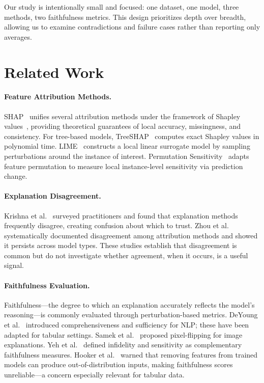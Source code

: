 \documentclass[conference, 10pt]{IEEEtran}
\begin{document}
Our study is intentionally small and focused: one dataset, one model, three methods, two faithfulness metrics. This design prioritizes depth over breadth, allowing us to examine contradictions and failure cases rather than reporting only averages.

\section{Related Work}
\label{sec:related-work}

\paragraph{Feature Attribution Methods.}
SHAP~\cite{lundberg2017shap} unifies several attribution methods under the framework of Shapley values~\cite{shapley1953value}, providing theoretical guarantees of local accuracy, missingness, and consistency. For tree-based models, TreeSHAP~\cite{lundberg2020treeshap} computes exact Shapley values in polynomial time. LIME~\cite{ribeiro2016lime} constructs a local linear surrogate model by sampling perturbations around the instance of interest. Permutation Sensitivity~\cite{fisher2019permutation, breiman2001random} adapts feature permutation to measure local instance-level sensitivity via prediction change.

\paragraph{Explanation Disagreement.}
Krishna et al.~\cite{krishna2022disagreement} surveyed practitioners and found that explanation methods frequently disagree, creating confusion about which to trust. Zhou et al.~\cite{zhou2022feature} systematically documented disagreement among attribution methods and showed it persists across model types. These studies establish that disagreement is common but do not investigate whether agreement, when it occurs, is a useful signal.

\paragraph{Faithfulness Evaluation.}
Faithfulness---the degree to which an explanation accurately reflects the model's reasoning---is commonly evaluated through perturbation-based metrics. DeYoung et al.~\cite{deyoung2020eraser} introduced comprehensiveness and sufficiency for NLP; these have been adapted for tabular settings. Samek et al.~\cite{samek2017evaluating} proposed pixel-flipping for image explanations. Yeh et al.~\cite{yeh2019infidelity} defined infidelity and sensitivity as complementary faithfulness measures. Hooker et al.~\cite{hooker2019benchmark} warned that removing features from trained models can produce out-of-distribution inputs, making faithfulness scores unreliable---a concern especially relevant for tabular data.
\end{document}
